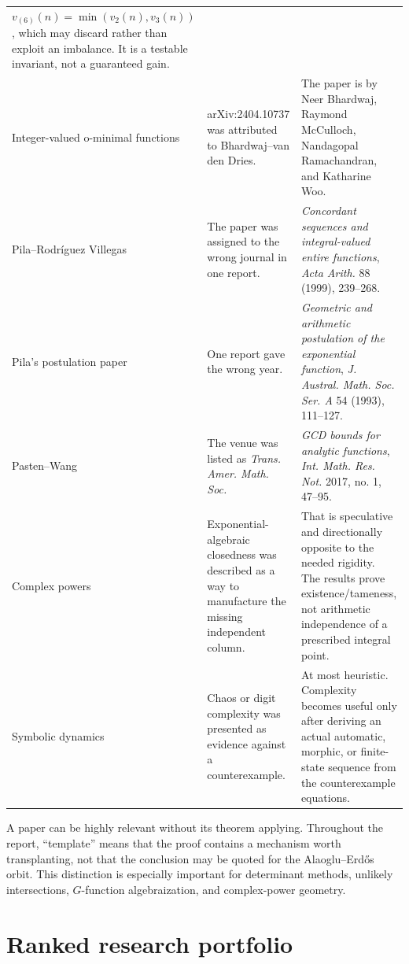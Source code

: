 \documentclass[10pt,letterpaper]{article}
\begin{document}
\begin{longtable}{@{}L{0.21\textwidth}L{0.34\textwidth}L{0.39\textwidth}@{}}
\(v_{(6)}(n)=\min(v_2(n),v_3(n))\), which may discard rather than exploit an imbalance.  It is
a testable invariant, not a guaranteed gain.\\
\addlinespace
Integer-valued o-minimal functions & arXiv:2404.10737 was attributed to Bhardwaj--van den
Dries. & The paper is by Neer Bhardwaj, Raymond McCulloch, Nandagopal Ramachandran, and
Katharine Woo.\\
\addlinespace
Pila--Rodr\'iguez Villegas & The paper was assigned to the wrong journal in one report. &
\emph{Concordant sequences and integral-valued entire functions}, \emph{Acta Arith.} 88
(1999), 239--268.\\
\addlinespace
Pila's postulation paper & One report gave the wrong year. & \emph{Geometric and arithmetic
postulation of the exponential function}, \emph{J. Austral. Math. Soc. Ser. A} 54 (1993),
111--127.\\
\addlinespace
Pasten--Wang & The venue was listed as \emph{Trans. Amer. Math. Soc.} & \emph{GCD bounds for
analytic functions}, \emph{Int. Math. Res. Not.} 2017, no. 1, 47--95.\\
\addlinespace
Complex powers & Exponential-algebraic closedness was described as a way to manufacture the
missing independent column. & That is speculative and directionally opposite to the needed
rigidity.  The results prove existence/tameness, not arithmetic independence of a prescribed
integral point.\\
\addlinespace
Symbolic dynamics & Chaos or digit complexity was presented as evidence against a
counterexample. & At most heuristic.  Complexity becomes useful only after deriving an
actual automatic, morphic, or finite-state sequence from the counterexample equations.\\
\end{longtable}
\endgroup

\begin{warningbox}
A paper can be highly relevant without its theorem applying.  Throughout the report,
``template'' means that the proof contains a mechanism worth transplanting, not that the
conclusion may be quoted for the Alaoglu--Erd\H{o}s orbit.  This distinction is especially
important for determinant methods, unlikely intersections, \(G\)-function algebraization,
and complex-power geometry.
\end{warningbox}

\section{Ranked research portfolio}
\label{sec:ranking}
\end{document}
